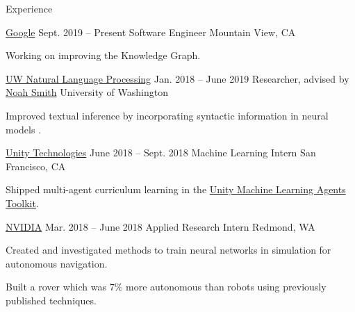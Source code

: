 \documentclass{resume}
\begin{document}
\begin{rSection}{Experience}
  \begin{rSubsection}{\href{https://careers.google.com/locations/mountain-view/}
                           {Google}}
                     {Sept. 2019 -- Present}
                     {Software Engineer}
                     {Mountain View, CA}
    \item Working on improving the Knowledge Graph.
  \end{rSubsection}

  \begin{rSubsection}{\href{https://nlp.washington.edu/}
                           {UW Natural Language Processing}}
                     {Jan. 2018 -- June 2019}
                     {Researcher, advised by
                       \href{https://homes.cs.washington.edu/~nasmith/}
                            {Noah Smith}}
                     {University of Washington}
    \item Improved textual inference by incorporating syntactic
      information in neural models \citep{pang2019improving}.
  \end{rSubsection}

  \begin{rSubsection}{{\href{https://unity3d.ai/}{Unity Technologies}}}
                      {June 2018 -- Sept. 2018}
                      {Machine Learning Intern}
                      {San Francisco, CA}
    \item Shipped multi-agent curriculum learning in the
      \href{https://github.com/Unity-Technologies/ml-agents}
           {Unity Machine Learning Agents Toolkit}.
  \end{rSubsection}

  \begin{rSubsection}{{\href{http://www.nvidia.com/page/home.html}{NVIDIA}}}
                      {Mar. 2018 -- June 2018}
                      {Applied Research Intern}
                      {Redmond, WA}
    \item Created and investigated methods to train neural networks in
      simulation for autonomous navigation.
    \item Built a rover which was 7\% more autonomous than robots using
      previously published techniques.
  \end{rSubsection}


\end{rSection}
\end{document}
